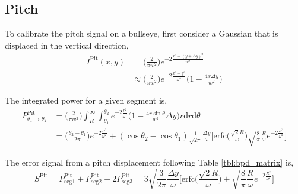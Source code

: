 \begin{appendices}
	\subsection{Pitch}
	To calibrate the pitch signal on a bullseye, first consider a Gaussian that is displaced in the vertical direction,
	\begin{equation}
	\begin{split}
	I^{\text{Pit}}(x,y) 	&= 			\bigg(\frac{2}{\pi w^2}\bigg) e^{-2 \frac{x^2 + (y+\Delta y)^2}{w^2}}\\
					&\approx	\bigg(\frac{2}{\pi w^2}\bigg) e^{-2 \frac{x^2 + y^2}{\omega^2}}  \bigg(1-\frac{4 x \Delta y}{w^2}\bigg)
	\end{split}
	\end{equation}
	
	The integrated power for a given segment is,
	\begin{equation}
	\begin{split}
	P^{\text{Pit}}_{\theta_1 \rightarrow \theta_2} 	&=  \bigg(\frac{2}{\pi w^2}\bigg) \int_{R}^{\infty} \int_{\theta_1}^{\theta_2} e^{-2 \frac{r^2}{\omega^2}}  \bigg(1-\frac{4 r \sin \theta}{w^2}\Delta y\bigg) r \text{d}r \text{d} \theta\\
		&= \bigg( \frac{\theta_2-\theta_1}{2 \pi}\bigg) e^{-2 \frac{R^2}{\omega^2}} + (\cos \theta_2 - \cos \theta_1) \frac{1}{\sqrt{2 \pi}} \frac{\Delta y}{\omega} \bigg[ 	  \text{erfc} \bigg(\frac{\sqrt{2} R}{\omega}\bigg) \sqrt{\frac{8}{\pi}} \frac{R}{\omega} e^{-2 \frac{R^2}{\omega^2}}\bigg]
	\end{split}
	\end{equation}
	
	The error signal from a pitch displacement following Table \ref{tbl:bpd_matrix} is,
	\begin{equation}
	S^{\text{Pit}} = P^{\text{Pit}}_{\text{seg1}} + P^{\text{Pit}}_{\text{seg2}} - 2 P^{\text{Pit}}_{\text{seg3}} = 3\sqrt{\frac{3}{2\pi}} \frac{\Delta y}{\omega} \bigg[ \text{erfc} \bigg(\frac{\sqrt{2} R}{\omega}\bigg) + \sqrt{\frac{8}{\pi }} \frac{R}{\omega} e^{-2 \frac{R^2}{\omega^2}} \bigg]
 	\end{equation}


\end{appendices}
